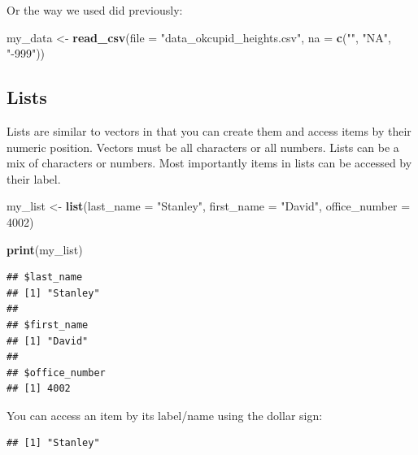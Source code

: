 \documentclass[
]{krantz}
\makeatletter
\newenvironment{Shaded}{\begin{snugshade}}{\end{snugshade}}
\newcommand{\DataTypeTok}[1]{\textcolor[rgb]{0.27,0.27,0.27}{#1}}
\newcommand{\DecValTok}[1]{\textcolor[rgb]{0.06,0.06,0.06}{#1}}
\newcommand{\KeywordTok}[1]{\textcolor[rgb]{0.27,0.27,0.27}{\textbf{#1}}}
\newcommand{\NormalTok}[1]{#1}
\newcommand{\OperatorTok}[1]{\textcolor[rgb]{0.43,0.43,0.43}{\textbf{#1}}}
\newcommand{\StringTok}[1]{\textcolor[rgb]{0.5,0.5,0.5}{#1}}
\newenvironment{kframe}{%
\medskip{}
\setlength{\fboxsep}{.8em}
 \def\at@end@of@kframe{}%
 \ifinner\ifhmode%
  \def\at@end@of@kframe{\end{minipage}}%
  \begin{minipage}{\columnwidth}%
 \fi\fi%
 \def\FrameCommand##1{\hskip\@totalleftmargin \hskip-\fboxsep
 \colorbox{shadecolor}{##1}\hskip-\fboxsep
     \hskip-\linewidth \hskip-\@totalleftmargin \hskip\columnwidth}%
 \MakeFramed {\advance\hsize-\width
   \@totalleftmargin\z@ \linewidth\hsize
   \@setminipage}}%
 {\par\unskip\endMakeFramed%
 \at@end@of@kframe}
\renewenvironment{Shaded}{\begin{kframe}}{\end{kframe}}
\makeatother
\begin{document}
Or the way we used did previously:

\begin{Shaded}
\begin{Highlighting}[]
\NormalTok{my_data <-}\StringTok{ }\KeywordTok{read_csv}\NormalTok{(}\DataTypeTok{file =} \StringTok{"data_okcupid_heights.csv"}\NormalTok{, }
                    \DataTypeTok{na =} \KeywordTok{c}\NormalTok{(}\StringTok{""}\NormalTok{, }\StringTok{"NA"}\NormalTok{, }\StringTok{"-999"}\NormalTok{))}
\end{Highlighting}
\end{Shaded}

\hypertarget{lists}{%
\subsection{Lists}\label{lists}}

Lists are similar to vectors in that you can create them and access items by their numeric position. Vectors must be all characters or all numbers. Lists can be a mix of characters or numbers. Most importantly items in lists can be accessed by their label.

\begin{Shaded}
\begin{Highlighting}[]
\NormalTok{my_list <-}\StringTok{ }\KeywordTok{list}\NormalTok{(}\DataTypeTok{last_name =} \StringTok{"Stanley"}\NormalTok{,}
                \DataTypeTok{first_name =} \StringTok{"David"}\NormalTok{,}
                \DataTypeTok{office_number =} \DecValTok{4002}\NormalTok{)}

\KeywordTok{print}\NormalTok{(my_list)}
\end{Highlighting}
\end{Shaded}

\begin{verbatim}
## $last_name
## [1] "Stanley"
## 
## $first_name
## [1] "David"
## 
## $office_number
## [1] 4002
\end{verbatim}

You can access an item by its label/name using the dollar sign:

\begin{Shaded}
\end{Shaded}

\begin{verbatim}
## [1] "Stanley"
\end{verbatim}
\end{document}
